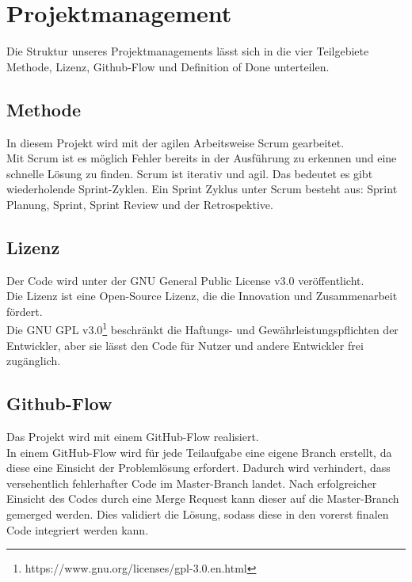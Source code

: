 \chapter{Projektmanagement}\label{ch:projektmanagement}
Die Struktur unseres Projektmanagements lässt sich in die vier Teilgebiete Methode, Lizenz, Github-Flow
und Definition of Done unterteilen.
\section{Methode}\label{sec:methode}

In diesem Projekt wird mit der agilen Arbeitsweise Scrum gearbeitet.\\
Mit Scrum ist es möglich Fehler bereits in der Ausführung zu erkennen und eine schnelle Lösung zu finden.
Scrum ist iterativ und agil.
Das bedeutet es gibt wiederholende Sprint-Zyklen.
Ein Sprint Zyklus unter Scrum besteht aus: Sprint Planung, Sprint, Sprint Review und der Retrospektive.

\section{Lizenz}\label{sec:lizenz}

Der Code wird unter der GNU General Public License v3.0 veröffentlicht.\\
Die Lizenz ist eine Open-Source Lizenz, die die Innovation und Zusammenarbeit fördert.\\
Die GNU GPL v3.0\footnote{https://www.gnu.org/licenses/gpl-3.0.en.html}
beschränkt die Haftungs- und Gewährleistungspflichten der Entwickler, aber sie lässt den Code für Nutzer und andere Entwickler frei zugänglich.

\section{Github-Flow}\label{sec:github-flow}

Das Projekt wird mit einem GitHub-Flow realisiert.\\
In einem GitHub-Flow wird für jede Teilaufgabe eine eigene Branch erstellt, da diese eine Einsicht der Problemlösung erfordert.
Dadurch wird verhindert, dass versehentlich fehlerhafter Code im Master-Branch landet.
Nach erfolgreicher Einsicht des Codes durch eine Merge Request kann dieser auf die Master-Branch gemerged werden.
Dies validiert die Lösung, sodass diese in den vorerst finalen Code integriert werden kann.

